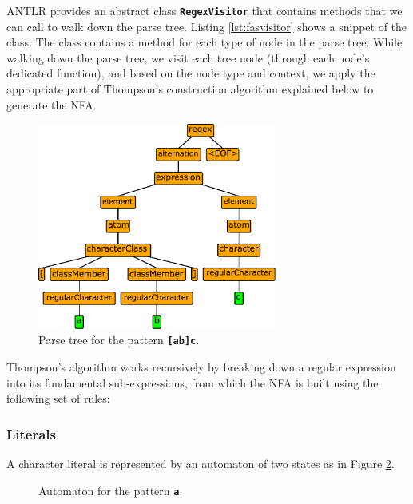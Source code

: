 ANTLR provides an abstract class \texttt{\textbf{RegexVisitor}} that contains methods that we can call to walk down the parse tree. Listing \ref{lst:fasvisitor} shows a snippet of the class. The class contains a method for each type of node in the parse tree. While walking down the parse tree, we visit each tree node (through each node's dedicated function), and based on the node type and context, we apply the appropriate part of Thompson's construction algorithm explained below to generate the NFA.

\begin{figure}[H]
    \centering
    \includegraphics[width=0.7\textwidth]{tree.pdf}
    \caption{Parse tree for the pattern \texttt{\textbf{[ab]c}}.}
    \label{fig:parsetree}
\end{figure}

Thompson's algorithm works recursively by breaking down a regular expression into its fundamental sub-expressions, from which the NFA is built using the following set of rules:

\subsubsection{Literals}
A character literal is represented by an automaton of two states as in Figure \ref{fig:auto1}.

\begin{figure}[htpb]
\centering
{}
\caption{Automaton for the pattern \texttt{\textbf{a}}.}
\label{fig:auto1}
\end{figure}
